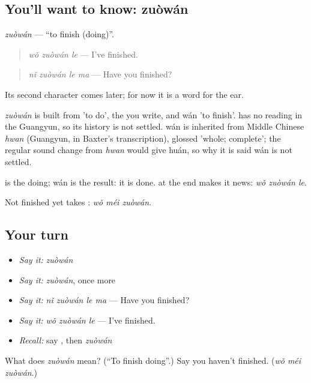 \subsection*{You'll want to know: zuòwán}
\emph{zuòwán} — \textquotedblleft{}to finish (doing)\textquotedblright{}.

\begin{quote}
\emph{wǒ zuòwán le} — I've finished.
\end{quote}

\begin{quote}
\emph{nǐ zuòwán le ma} — Have you finished?
\end{quote}

Its second character comes later; for now it is a word for the ear.

\begin{cousinweb}
\emph{zuòwán} is built from  'to do', the  you write, and wán 'to finish'.  has no reading in the Guangyun, so its history is not settled. wán is inherited from Middle Chinese \emph{hwan} (Guangyun, in Baxter's transcription), glossed 'whole; complete'; the regular sound change from \emph{hwan} would give huán, so why it is said wán is not settled.
\end{cousinweb}

\begin{grammarlens}[title={What you've built}]
 is the doing; wán is the result: it is done.  at the end makes it news: \emph{wǒ zuòwán le}.

Not finished yet takes : \emph{wǒ méi zuòwán}.
\end{grammarlens}

\subsection*{Your turn}
\begin{itemize}
\raggedright
  \item \emph{Say it:} \emph{zuòwán}
  \item \emph{Say it:} \emph{zuòwán}, once more
  \item \emph{Say it:} \emph{nǐ zuòwán le ma} — Have you finished?
  \item \emph{Say it:} \emph{wǒ zuòwán le} — I've finished.
  \item \emph{Recall:} say , then \emph{zuòwán}
\end{itemize}

\begin{tcolorbox}[breakable,colback=teal!4,colframe=teal!35!black,title={Before you move on}]
What does \emph{zuòwán} mean? (\textquotedblleft{}To finish doing\textquotedblright{}.) Say you haven't finished. (\emph{wǒ méi zuòwán}.)
\end{tcolorbox}

